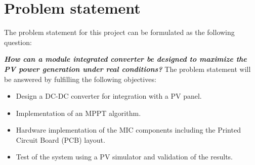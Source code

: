 \section{Problem statement}

The problem statement for this project can be formulated as the following question: 
\newline

\textbf{\textit{\large{How can a module integrated converter be designed to maximize the PV power generation under real conditions?}}}
\newline
\newline
The problem statement will be answered by fulfilling the following objectives: 

\begin{itemize}
	\item Design a DC-DC converter for integration with a PV panel.
	\item Implementation of an MPPT algorithm.
	\item Hardware implementation of the MIC components including the Printed Circuit Board (PCB) layout.
	\item Test of the system using a PV simulator and validation of the results. 
\end{itemize}
